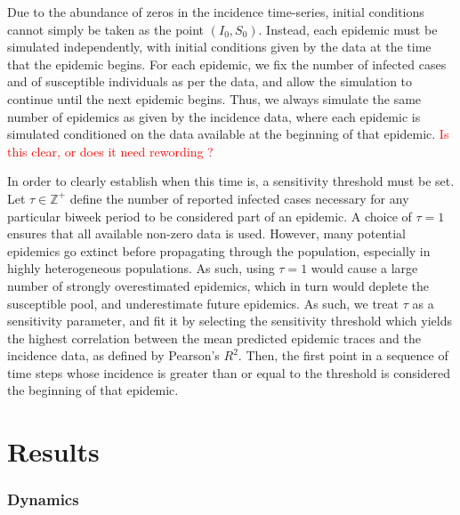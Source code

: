 \documentclass[10pt]{article}
\begin{document}
Due to the abundance of zeros in the incidence time-series, initial conditions cannot simply be taken as the point $\left(I_0, S_0\right)$. Instead, each epidemic must be simulated independently, with initial conditions given by the data at the time that the epidemic begins. For each epidemic, we fix the number of infected cases and of susceptible individuals as per the data, and allow the simulation to continue until the next epidemic begins. Thus, we always simulate the same number of epidemics as given by the incidence data, where each epidemic is simulated conditioned on the data available at the beginning of that epidemic. \textcolor{red}{Is this clear, or does it need rewording ?}

In order to clearly establish when this time is, a sensitivity threshold must be set. Let $\tau \in \mathbb{Z}^+$ define the number of reported infected cases necessary for any particular biweek period to be considered part of an epidemic. A choice of $\tau = 1$ ensures that all available non-zero data is used. However, many potential epidemics go extinct before propagating through the population, especially in highly heterogeneous populations. As such, using $\tau=1$ would cause a large number of strongly overestimated epidemics, which in turn would deplete the susceptible pool, and underestimate future epidemics. As such, we treat $\tau$ as a sensitivity parameter, and fit it by selecting the sensitivity threshold which yields the highest correlation between the mean predicted epidemic traces and the incidence data, as defined by Pearson's $R^2$. Then, the first point in a sequence of time steps whose incidence is greater than or equal to the threshold is considered the beginning of that epidemic.




















\section*{Results}

\subsubsection*{Dynamics}
\end{document}
